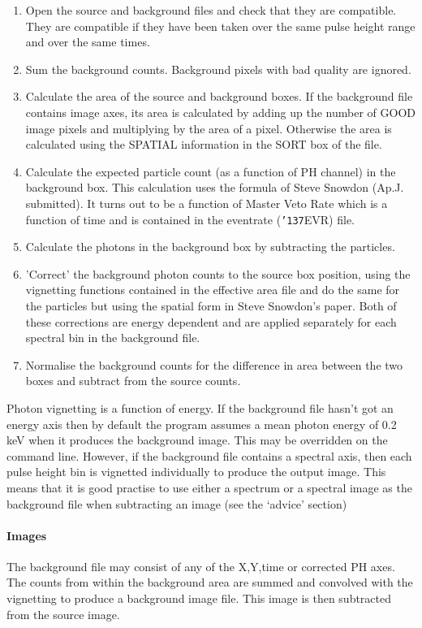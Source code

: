 \documentclass{book}
\renewcommand{\_}{{\tt\char'137}}     %
\begin{document}
\begin{enumerate}
\item Open the source and background files and check that they
are compatible. They are compatible if they have been taken
over the same pulse height range and over the same times.
\item Sum the background counts. Background pixels with bad quality
are ignored.
\item Calculate the area of the source and background boxes. If the
background file contains image axes, its area is calculated
by adding up the number of GOOD image pixels and multiplying
by the area of a pixel. Otherwise the area is calculated
using the SPATIAL information in the SORT box of the file.
\item Calculate the expected particle count (as a function of PH
channel) in the background box. This calculation uses the
formula of Steve Snowdon (Ap.J. submitted). It turns out to
be a function of Master Veto Rate which is a function of
time and is contained in the eventrate (\_EVR) file.
\item Calculate the photons in the background box by subtracting
the particles.
\item 'Correct' the background photon counts to the source box
position, using the vignetting functions contained in the
effective area file and do the same for the particles but
using the spatial form in Steve Snowdon's paper. Both of
these corrections are energy dependent and are applied
separately for each spectral bin in the background file.

\item Normalise the background counts for the difference in area
between the two boxes and subtract from the source counts.
\end{enumerate}
Photon vignetting is a function of energy. If the background file
hasn't got an energy axis then by default the program assumes a mean
photon energy of 0.2 keV when it produces the background image.
This may be overridden on the command line. However, if the background
file contains a spectral axis, then each pulse height bin is vignetted
individually to produce the output image. This means that it is
good practise to use either a spectrum or a spectral image as the
background file when subtracting an image (see the `advice' section)
\paragraph{Images}
The background file may consist of any of the X,Y,time or corrected
PH axes. The counts from within the background area are summed and
convolved with the vignetting to produce a background image file.
This image is then subtracted from the source image.
\end{document}
